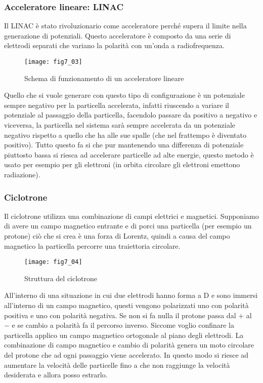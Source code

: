 \subsubsection{Acceleratore lineare: LINAC}
Il LINAC è stato rivoluzionario come acceleratore perché supera il limite nella generazione di potenziali.
Questo acceleratore è composto da una serie di elettrodi separati che variano la polarità con un'onda a radiofrequenza.
\begin{figure}[h]
\centering
\texttt{[image: fig7\_03]}
\caption{Schema di funzionamento di un acceleratore lineare}
\end{figure}

Quello che si vuole generare con questo tipo di configurazione è un potenziale sempre negativo per la particella accelerata, infatti riuscendo a variare il potenziale al passaggio della particella, facendolo passare da positivo a negativo e viceversa, la particella nel sistema sarà sempre accelerata da un potenziale negativo rispetto a quello che ha alle sue spalle (che nel frattempo è diventato positivo).
Tutto questo fa si che pur mantenendo una differenza di potenziale piuttosto bassa si riesca ad accelerare particelle ad alte energie, questo metodo è usato per esempio per gli elettroni (in orbita circolare gli elettroni emettono radiazione).

\subsubsection{Ciclotrone}
Il ciclotrone utilizza una combinazione di campi elettrici e magnetici.
Supponiamo di avere un campo magnetico entrante e di porci una particella (per esempio un protone) ciò che si crea è una forza di Lorentz, quindi a causa del campo magnetico la particella percorre una traiettoria circolare.
\begin{figure}[h]
\centering
\texttt{[image: fig7\_04]}
\caption{Struttura del ciclotrone}
\end{figure}

All'interno di una situazione in cui due elettrodi hanno forma a D e sono immersi all'interno di un campo magnetico, questi vengono polarizzati uno con polarità positiva e uno con polarità negativa.
Se non si fa nulla il protone passa dal $+$ al $-$ e se cambio a polarità fa il percorso inverso.
Siccome voglio confinare la particella  applico un campo magnetico ortogonale al piano degli elettrodi.
La combinazione di campo magnetico e cambio di polarità genera un moto circolare del protone che ad ogni passaggio viene accelerato.
In questo modo si riesce ad aumentare la velocità delle particelle fino a che non raggiunge la velocità desiderata e allora posso estrarlo.

